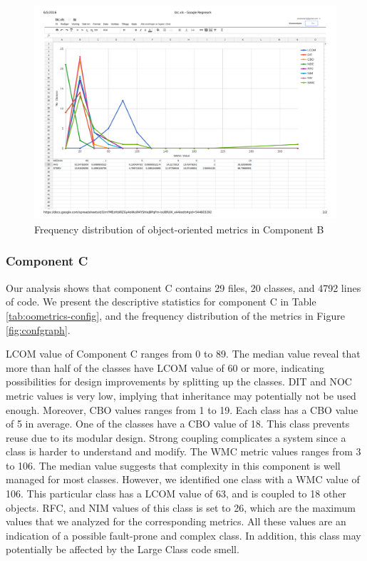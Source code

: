 \begin{landscape}
\setlength\LTleft{-.5in}
	\begin{figure}
	\centering
	\includegraphics[width=\textwidth]{images/pdf/blc.pdf}
	\caption{Frequency distribution of object-oriented metrics in Component B}
	\label{fig:blcgraph}
	\end{figure}
\end{landscape}



\subsubsection{Component C}
Our analysis shows that component C contains 29 files, 20 classes, and 4792 lines of code. We present the descriptive statistics for component C in Table \ref{tab:oometrics-config}, and the frequency distribution of the metrics in Figure \ref{fig:confgraph}.

LCOM value of Component C ranges from 0 to 89. The median value reveal that more than half of the classes have LCOM value of 60 or more, indicating possibilities for design improvements by splitting up the classes. DIT and NOC metric values is very low, implying that inheritance may potentially not be used enough. Moreover, CBO values ranges from 1 to 19. Each class has a CBO value of 5 in average. One of the classes have a CBO value of 18. This class prevents reuse due to its modular design. Strong coupling complicates a system since a class is harder to understand and modify. The WMC metric values ranges from 3 to 106. The median value suggests that complexity in this component is well managed for most classes. However, we identified one class with a WMC value of 106. This particular class has a LCOM value of 63, and is coupled to 18 other objects. RFC, and NIM values of this class is set to 26, which are the maximum values that we analyzed for the corresponding metrics. All these values are an indication of a possible fault-prone and complex class. In addition, this class may potentially be affected by the Large Class code smell.

